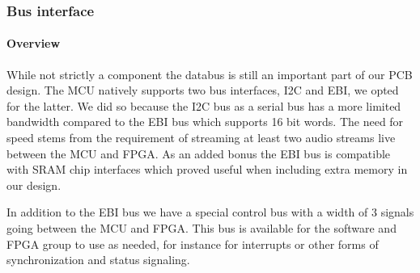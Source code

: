 \subsubsection{Bus interface}
\paragraph{Overview}

While not strictly a component the databus is still an important part of
our PCB design. The MCU natively supports two bus interfaces, I2C and EBI,
we opted for the latter. We did so because the I2C bus as a
serial bus has a more limited bandwidth compared to the EBI bus which
supports 16 bit words. The need for speed stems from the requirement of
streaming at least two audio streams live between the MCU and FPGA.
As an added bonus the EBI bus is compatible with SRAM chip interfaces
which proved useful when including extra memory in our design.


In addition to the EBI bus we have a special control bus with a width
of 3 signals going between the MCU and FPGA. This bus is available for the
software and FPGA group to use as needed, for instance for interrupts or
other forms of synchronization and status signaling.